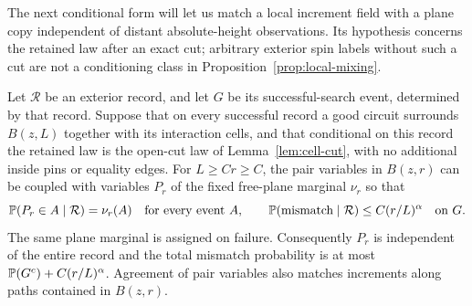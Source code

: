 The next conditional form will let us match a local increment field with
a plane copy independent of distant absolute-height observations.  Its
hypothesis concerns the retained law after an exact cut; arbitrary exterior
spin labels without such a cut are not a conditioning class in
Proposition~\ref{prop:local-mixing}.

\begin{corollary}
\label{cor:conditional-plane-matching}
Let $\mathcal R$ be an exterior record, and let $G$ be its
successful-search event, determined by that record.  Suppose that on every successful record a good
circuit surrounds $B(z,L)$ together with its interaction cells, and that
conditional on this record the retained law is the open-cut law of
Lemma~\ref{lem:cell-cut}, with no additional inside pins or equality edges.
For $L\ge Cr\ge C$, the pair variables in $B(z,r)$ can be coupled with
variables $P_r$ of the fixed free-plane marginal $\nu_r$ so that
\[
 \mathbb P(P_r\in A\mid\mathcal R)=\nu_r(A)
 \quad\text{for every event }A,
 \qquad
 \mathbb P(\text{mismatch}\mid\mathcal R)\le C(r/L)^\alpha
 \quad\text{on }G.
\]
The same plane marginal is assigned on failure.  Consequently $P_r$ is
independent of the entire record and the total mismatch probability is at
most $\mathbb P(G^c)+C(r/L)^\alpha$.  Agreement of pair variables also matches
increments along paths contained in $B(z,r)$.
\end{corollary}
